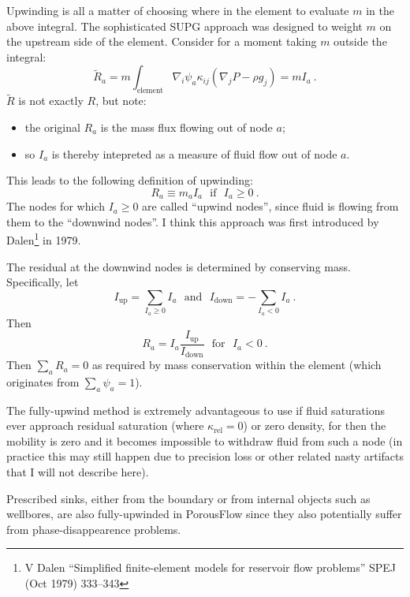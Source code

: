 \documentclass[12pt]{report}
\begin{document}
Upwinding is all a matter of choosing where in the element to evaluate
$m$ in the above integral.  The sophisticated SUPG approach was
designed to weight $m$ on the upstream side of the element.  Consider
for a moment taking $m$ outside the integral:
\begin{equation}
\tilde{R}_{a} = m\int_{\mathrm{element}} \nabla_{i}\psi_{a}
\kappa_{ij}(\nabla_{j}P - \rho
g_{j}) = m I_{a} \ .
\end{equation}
$\tilde{R}$ is not exactly $R$, but note:
\begin{itemize}
\item the original $R_{a}$ is the mass flux flowing out of node $a$;
\item so $I_{a}$ is thereby intepreted as a measure of fluid flow out of
  node $a$.
\end{itemize}
This leads to the following definition of upwinding:
\begin{equation}
R_{a} \equiv m_{a}I_{a} \ \ \ \mbox{if}\ \ \ I_{a}\geq 0 \ .
\end{equation}
The nodes for which $I_{a}\geq 0$ are called ``upwind nodes'', since
fluid is flowing from them to the ``downwind nodes''.  I think this
approach was first introduced by Dalen\footnote{V Dalen ``Simplified
  finite-element models for reservoir flow problems'' SPEJ (Oct 1979)
  333--343} in 1979.

The residual at the downwind nodes is determined by conserving mass.
Specifically, let
\begin{equation}
I_{\mathrm{up}} = \sum_{I_{a}\geq 0}I_{a} \ \ \ \mbox{and}\ \ \
I_{\mathrm{down}} = -\sum_{I_{a}<0} I_{a} \ .
\end{equation}
Then
\begin{equation}
R_{a} = I_{a}\frac{I_{\mathrm{up}}}{I_{\mathrm{down}}}
\ \ \ \mbox{for}\ \ \ I_{a}<0 \ .
\end{equation}
Then $\sum_{a} R_{a} = 0$ as required by mass conservation within the
element (which originates from $\sum_{a} \psi_{a} = 1$).

The fully-upwind method is extremely
advantageous to use if fluid saturations ever approach residual
saturation (where $\kappa_{\mathrm{rel}}=0$) or zero density, for then
the mobility is zero and it becomes impossible to withdraw fluid from
such a node (in practice this may still happen due to precision loss
or other related nasty artifacts that I will not describe here).

Prescribed sinks, either from the boundary or from internal objects
such as wellbores, are also fully-upwinded in PorousFlow since they
also potentially suffer from phase-disappearence problems.
\end{document}
